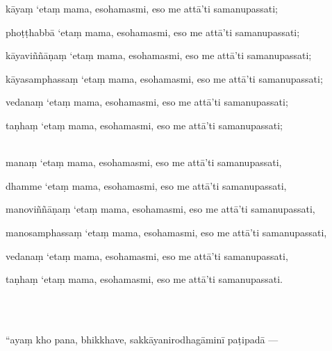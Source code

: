 \documentclass[9pt]{article}
\begin{document}
{{kāyaṃ ‘etaṃ mama, esohamasmi, eso me attā’ti samanupassati;\

phoṭṭhabbā ‘etaṃ mama, esohamasmi, eso me attā’ti samanupassati;\

kāyaviññāṇaṃ ‘etaṃ mama, esohamasmi, eso me attā’ti samanupassati;\

kāyasamphassaṃ ‘etaṃ mama, esohamasmi, eso me attā’ti samanupassati;\

vedanaṃ ‘etaṃ mama, esohamasmi, eso me attā’ti samanupassati;\

taṇhaṃ ‘etaṃ mama, esohamasmi, eso me attā’ti samanupassati;\\\

manaṃ ‘etaṃ mama, esohamasmi, eso me attā’ti samanupassati,\

dhamme ‘etaṃ mama, esohamasmi, eso me attā’ti samanupassati,\

manoviññāṇaṃ ‘etaṃ mama, esohamasmi, eso me attā’ti samanupassati,\

manosamphassaṃ ‘etaṃ mama, esohamasmi, eso me attā’ti samanupassati,\

vedanaṃ ‘etaṃ mama, esohamasmi, eso me attā’ti samanupassati,\

taṇhaṃ ‘etaṃ mama, esohamasmi, eso me attā’ti samanupassati.}}\\\

“ayaṃ kho pana, bhikkhave, sakkāyanirodhagāminī paṭipadā —\\\
\end{document}
